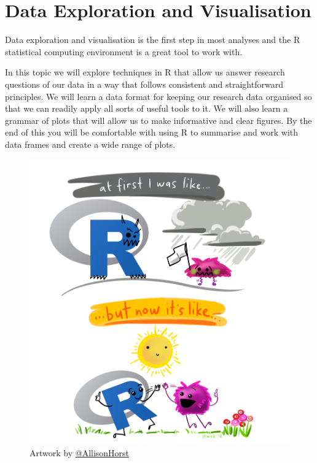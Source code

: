 \documentclass[
]{book}
\begin{document}
\hypertarget{data-exploration-and-visualisation}{%
\chapter{Data Exploration and Visualisation}\label{data-exploration-and-visualisation}}

Data exploration and visualisation is the first step in most analyses and the R statistical computing environment is a great tool to work with.

In this topic we will explore techniques in R that allow us answer research questions of our data in a way that follows consistent and straightforward principles. We will learn a data format for keeping our research data organised so that we can readily apply all sorts of useful tools to it. We will also learn a grammar of plots that will allow us to make informative and clear figures. By the end of this you will be comfortable with using R to summarise and work with data frames and create a wide range of plots.

\begin{figure}
\centering
\includegraphics{r_first_then.png}
\caption{\label{fig:unnamed-chunk-3}Artwork by \href{https://github.com/allisonhorst}{@AllisonHorst}}
\end{figure}
\end{document}
